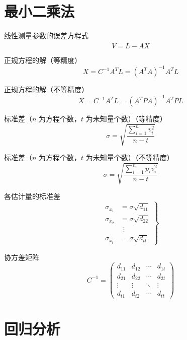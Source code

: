 \documentclass[12pt,a4paper]{ctexart}
\begin{document}
\section{最小二乘法}

线性测量参数的误差方程式
\begin{equation*}
V=L-A\hat{X}
\end{equation*}

正规方程的解（等精度）
\begin{equation*}
X=C^{-1} A^T L={(A^T A)}^{-1} A^T L
\end{equation*}

正规方程的解（不等精度）
\begin{equation*}
X=C^{-1} A^T L={(A^T PA)}^{-1} A^T PL
\end{equation*}

标准差（$n$ 为方程个数，$t$ 为未知量个数）（等精度）
\begin{equation*}
\sigma=\sqrt{\frac{\sum_{i=1}^{n}v_i^2}{n-t}}
\end{equation*}

标准差（$n$ 为方程个数，$t$ 为未知量个数）（不等精度）
\begin{equation*}
\sigma=\sqrt{\frac{\sum_{i=1}^{n}p_i v_i^2}{n-t}}
\end{equation*}

各估计量的标准差
\begin{equation*}
\left.
\begin{aligned}
\sigma_{x_1} &= \sigma \sqrt{d_{11}} \\
\sigma_{x_2} &= \sigma \sqrt{d_{22}} \\
&\ \ \vdots \\
\sigma_{x_t} &= \sigma \sqrt{d_{tt}}
\end{aligned}
\right\}
\end{equation*}

协方差矩阵
\begin{equation*}
C^{-1}
=
\begin{pmatrix}
d_{11} & d_{12} & \cdots & d_{1t} \\
d_{21} & d_{22} & \cdots & d_{2t} \\
\vdots & \vdots & \ddots & \vdots \\
d_{t1} & d_{t2} & \cdots & d_{tt}
\end{pmatrix}
\end{equation*}

\section{回归分析}
\end{document}
